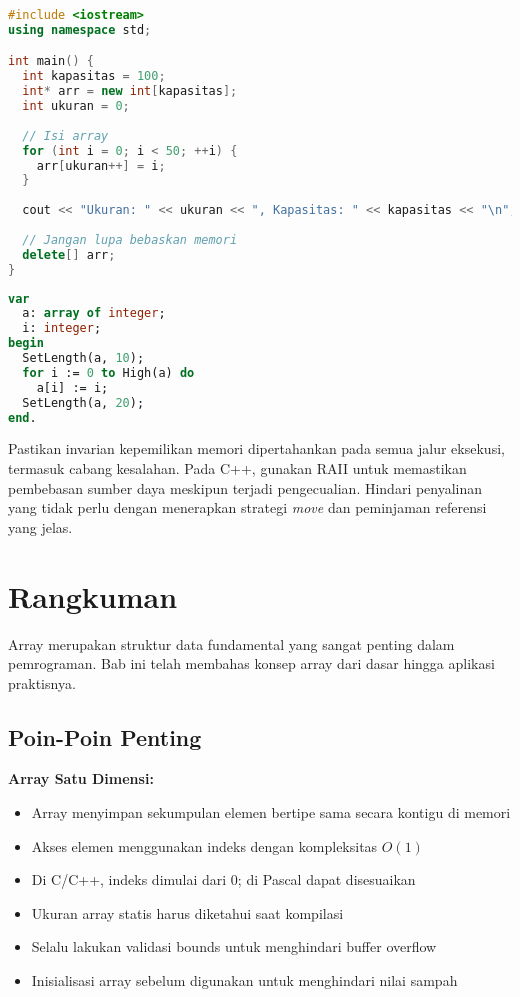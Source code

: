 \documentclass[../main.tex]{subfiles}
\begin{document}
\begin{lstlisting}[language=C++, caption={Alokasi dinamis array di C++}]
#include <iostream>
using namespace std;

int main() {
  int kapasitas = 100;
  int* arr = new int[kapasitas];
  int ukuran = 0;
  
  // Isi array
  for (int i = 0; i < 50; ++i) {
    arr[ukuran++] = i;
  }
  
  cout << "Ukuran: " << ukuran << ", Kapasitas: " << kapasitas << "\n";
  
  // Jangan lupa bebaskan memori
  delete[] arr;
}
\end{lstlisting}

\begin{lstlisting}[language=Pascal, caption={Array dinamis di Free Pascal}]
var
  a: array of integer;
  i: integer;
begin
  SetLength(a, 10);
  for i := 0 to High(a) do
    a[i] := i;
  SetLength(a, 20);
end.
\end{lstlisting}

Pastikan invarian kepemilikan memori dipertahankan pada semua jalur eksekusi, termasuk cabang kesalahan. Pada C++, gunakan RAII untuk memastikan pembebasan sumber daya meskipun terjadi pengecualian. Hindari penyalinan yang tidak perlu dengan menerapkan strategi \emph{move} dan peminjaman referensi yang jelas.

\section{Rangkuman}

Array merupakan struktur data fundamental yang sangat penting dalam pemrograman. Bab ini telah membahas konsep array dari dasar hingga aplikasi praktisnya.

\subsection{Poin-Poin Penting}

\textbf{Array Satu Dimensi:}
\begin{itemize}
  \item Array menyimpan sekumpulan elemen bertipe sama secara kontigu di memori
  \item Akses elemen menggunakan indeks dengan kompleksitas \(O(1)\)
  \item Di C/C++, indeks dimulai dari 0; di Pascal dapat disesuaikan
  \item Ukuran array statis harus diketahui saat kompilasi
  \item Selalu lakukan validasi bounds untuk menghindari buffer overflow
  \item Inisialisasi array sebelum digunakan untuk menghindari nilai sampah
\end{itemize}
\end{document}
